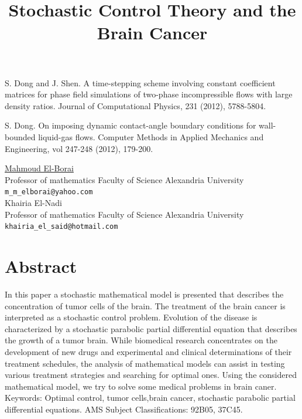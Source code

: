\documentclass[article,A4,11pt]{llncs}%
\begin{document}

\begin{thebibliography}{10}
{\sc S. Dong and J. Shen}. {A time-stepping scheme involving constant coefficient matrices for phase field simulations of two-phase incompressible flows with large density ratios}. Journal of Computational Physics, 231 (2012), 5788-5804.

{\sc S. Dong}. {On imposing dynamic contact-angle boundary conditions for wall-bounded liquid-gas flows}. Computer Methods in Applied Mechanics and Engineering, vol 247-248 (2012), 179-200.
\end{thebibliography}

\title{Stochastic Control Theory and the Brain Cancer}
 \author{} \institute{}
\maketitle
\begin{center}
{\large \underline{Mahmoud El-Borai}}\\
Professor of mathematics Faculty of Science Alexandria University\\
{\tt \tt m\_m\_elborai@yahoo.com}
\\ \vspace{4mm}
{\large Khairia El-Nadi}\\
Professor of mathematics Faculty of Science Alexandria University\\
{\tt \tt khairia\_el\_said@hotmail.com}
\end{center}

\section*{Abstract}

 In this paper a stochastic mathematical model is presented that describes the concentration of tumor cells of the brain. The treatment of the brain cancer is interpreted as a stochastic  control problem. Evolution of the disease is characterized by a stochastic parabolic partial differential equation that describes the growth of a tumor brain.
While biomedical research concentrates on the development of new drugs and experimental and clinical determinations of their treatment schedules, the analysis of mathematical models can assist in testing various treatment strategies and searching for optimal ones.
Using the considered mathematical model, we try to solve some medical problems in brain caner.
Keywords: Optimal control, tumor cells,brain cancer, stochastic parabolic partial differential equations.
AMS Subject Classifications: 92B05, 37C45.
\end{document}
